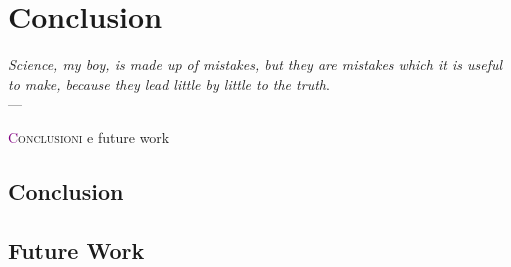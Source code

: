 \chapter{Conclusion} \label{chap:conclusion}
\begin{flushright}{\slshape    
   Science, my boy, is made up of mistakes, but they are mistakes
   which it is useful to make, because they lead little by little
   to the truth}. \\ \medskip --- \citeauthor{verne_journey:1957}
    \citeyear{verne_journey:1957}
\end{flushright} 
\lettrine[lines=4]{\textcolor{purple}{C}}{onclusioni} e future work
\section{Conclusion}\label{sec:conclusion}

\section{Future Work}\label{sec:future_work}
